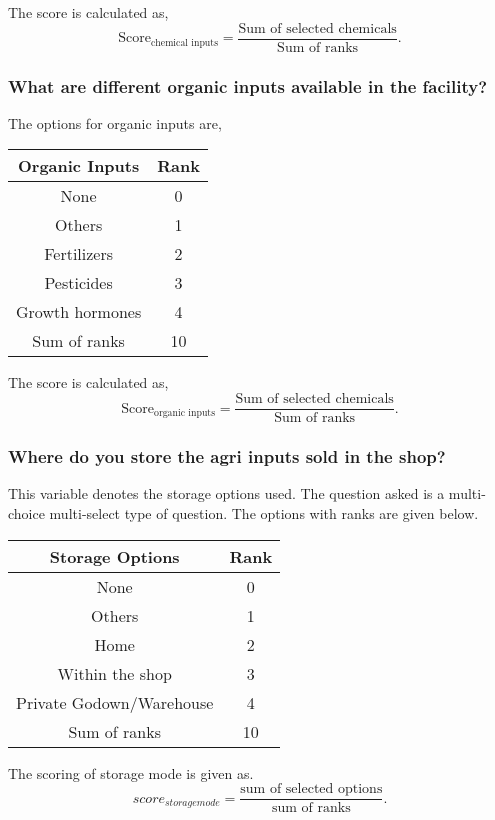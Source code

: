 \documentclass[oneside,twocolumn]{article}
\newcommand{\tsub}[2]{\text{#1}_{\text{#2}}}
\newenvironment{ttable}
               {
                 \begin{center}
                   \begin{tabular}{c|c}
                     \hline
               }
               {
                 \\ \hline
                   \end{tabular}
                 \end{center}
               }
\begin{document}
               The score is calculated as,
               \[
               \tsub{Score}{chemical inputs} = \dfrac{\text{Sum of selected chemicals}}{\text{Sum of ranks}}.
               \]

               \subsubsection{What are different organic inputs available in the facility?}
               The options for organic inputs are,
               \begin{ttable}
                 Organic Inputs & Rank \\ \hline
                 None & 0 \\
                 Others & 1 \\
                 Fertilizers & 2 \\
                 Pesticides & 3 \\
                 Growth hormones & 4 \\ \hline
                 Sum of ranks & 10
               \end{ttable}

               The score is calculated as,
               \[
               \tsub{Score}{organic inputs} = \dfrac{\text{Sum of selected chemicals}}{\text{Sum of ranks}}.
               \]

               \subsubsection{Where do you store the agri inputs sold in the shop?}
               This variable denotes the storage options used. The question asked is a
multi-choice multi-select type of question. The options with ranks are
given below.
\begin{center}
  \begin{tabular}{c|c}
    \hline
    Storage Options & Rank \\ \hline
    None & 0 \\
    Others & 1 \\
    Home & 2 \\
    Within the shop & 3 \\
    Private Godown/Warehouse & 4 \\ \hline
    Sum of ranks & 10 \\ \hline
  \end{tabular}
\end{center}
The scoring of storage mode is given as.
\[
score_{storage mode} = \dfrac{\text{sum of selected options}}{\text{sum of ranks}}.
\]
\end{document}
